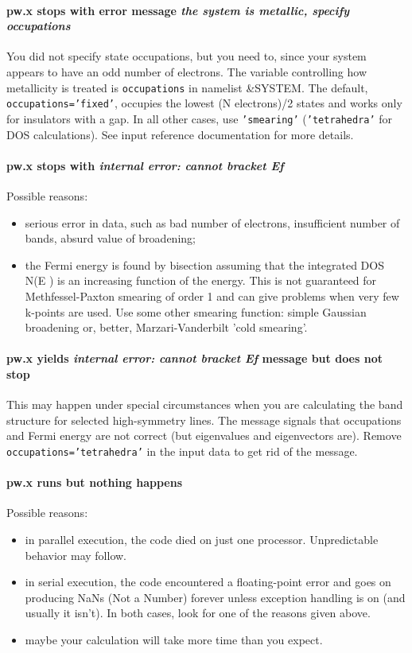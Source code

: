 \documentclass[12pt,a4paper]{article}
\begin{document}
\paragraph{pw.x stops with error message {\em the system is metallic,
 specify occupations}} 
You did not specify state occupations, but you need to, since your
system appears to have an odd number of electrons. The variable
controlling how metallicity is treated is \texttt{occupations} in namelist
\&SYSTEM. The default, \texttt{occupations='fixed'}, occupies the lowest
(N electrons)/2 states and works only for insulators with a gap. In all other
cases, use \texttt{'smearing'} (\texttt{'tetrahedra'} for DOS calculations). 
See input reference documentation for more details.

\paragraph{pw.x stops with {\em internal error: cannot bracket Ef}}
Possible reasons:
\begin{itemize}
\item serious error in data, such as bad number of electrons,
  insufficient number of bands, absurd value of broadening; 
\item the Fermi energy is found by bisection assuming that the
  integrated DOS N(E ) is an increasing function of the energy. This
  is not guaranteed for Methfessel-Paxton smearing of order 1 and can
  give problems when very few k-points are used. Use some other
  smearing function: simple Gaussian broadening or, better,
  Marzari-Vanderbilt 'cold smearing'. 
\end{itemize}

\paragraph{pw.x yields {\em internal error: cannot bracket Ef} message 
but does not stop} 
This may happen under special circumstances when you are calculating
the band structure for selected high-symmetry lines. The message
signals that occupations and Fermi energy are not correct (but
eigenvalues and eigenvectors are). Remove \texttt{occupations='tetrahedra'}
in the input data to get rid of the message. 

\paragraph{pw.x runs but nothing happens}
Possible reasons:
\begin{itemize}
\item in parallel execution, the code died on just one
  processor. Unpredictable behavior may follow. 
\item in serial execution, the code encountered a floating-point error
  and goes on producing NaNs (Not a Number) forever unless exception
  handling is on (and usually it isn't). In both cases, look for one
  of the reasons given above. 
\item maybe your calculation will take more time than you expect.
\end{itemize}
\end{document}

